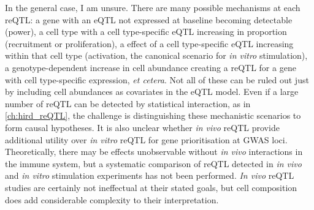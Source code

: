 In the general case, I am unsure.
There are many possible mechanisms at each \gls{reQTL}:
a gene with an \gls{eQTL} not expressed at baseline becoming detectable (power),
a cell type with a cell type-specific \gls{eQTL} increasing in proportion (recruitment or proliferation),
a effect of a cell type-specific \gls{eQTL} increasing within that cell type (activation, the canonical scenario for \textit{in vitro} stimulation),
a genotype-dependent increase in cell abundance creating a \gls{reQTL} for a gene with cell type-specific expression,
\textit{et cetera}.
Not all of these can be ruled out just by including cell abundances as covariates in the \gls{eQTL} model.
Even if a large number of \gls{reQTL} can be detected by statistical interaction, as in \cref{ch:hird_reQTL},
the challenge is distinguishing these mechanistic scenarios to form causal hypotheses.
It is also unclear whether \textit{in vivo} \gls{reQTL} provide additional utility over \textit{in vitro} \gls{reQTL} for gene prioritisation at \gls{GWAS} loci.
Theoretically, there may be effects unobservable without \textit{in vivo} interactions in the immune system, 
but a systematic comparison of \gls{reQTL} detected in \textit{in vivo} and \textit{in vitro} stimulation experiments has not been performed.
\textit{In vivo} \gls{reQTL} studies are certainly not ineffectual at their stated goals, 
but cell composition does add considerable complexity to their interpretation.

